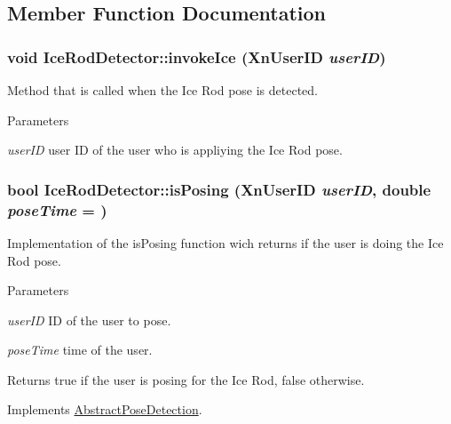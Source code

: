 \subsection{Member Function Documentation}
\hypertarget{classIceRodDetector_a91498b2cb7bcfa6dd0fe4dae60b50d40}{
\subsubsection[{invokeIce}]{\setlength{\rightskip}{0pt plus 5cm}void IceRodDetector::invokeIce (XnUserID {\em userID})}}
\label{classIceRodDetector_a91498b2cb7bcfa6dd0fe4dae60b50d40}
Method that is called when the Ice Rod pose is detected. 
\begin{DoxyParams}{Parameters}
\item[{\em userID}]user ID of the user who is appliying the Ice Rod pose. \end{DoxyParams}
\hypertarget{classIceRodDetector_a81a33e1302a9f8336d6e8bf49c421e2a}{
\subsubsection[{isPosing}]{\setlength{\rightskip}{0pt plus 5cm}bool IceRodDetector::isPosing (XnUserID {\em userID}, \/  double {\em poseTime} = {})}}
\label{classIceRodDetector_a81a33e1302a9f8336d6e8bf49c421e2a}
Implementation of the isPosing function wich returns if the user is doing the Ice Rod pose. 
\begin{DoxyParams}{Parameters}
\item[{\em userID}]ID of the user to pose. \item[{\em poseTime}]time of the user. \end{DoxyParams}
\begin{DoxyReturn}{Returns}
true if the user is posing for the Ice Rod, false otherwise. 
\end{DoxyReturn}


Implements \hyperlink{classAbstractPoseDetection_ac3343980a1c6b822743b43c4274275e9}{AbstractPoseDetection}.

